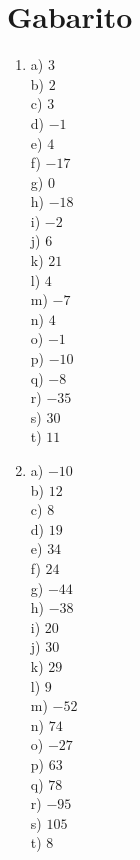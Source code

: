 \documentclass{exam}
\begin{document}
\newpage
\section{Gabarito}

\begin{multicols*}{4}
\setlength{\columnseprule}{1pt}
\begin{enumerate}

\item 	a) $3$ \\
		b) $2$ \\
		c) $3$ \\
		d) $-1$ \\
		e) $4$ \\
		f) $-17$ \\
		g) $0$ \\
		h) $-18$ \\
		i) $-2$ \\
		j) $6$ \\
		k) $21$ \\
		l) $4$ \\
		m) $-7$ \\
		n) $4$ \\
		o) $-1$ \\
		p) $-10$ \\
		q) $-8$ \\
		r) $-35$ \\
		s) $30$ \\
		t) $11$ \\
		
\item 	a) $-10$ \\
		b) $12$ \\
		c) $8$ \\
		d) $19$ \\
		e) $34$ \\
		f) $24$ \\
		g) $-44$ \\
		h) $-38$ \\
		i) $20$ \\
		j) $30$ \\
		k) $29$ \\
		l) $9$ \\
		m) $-52$ \\
		n) $74$ \\
		o) $-27$ \\
		p) $63$ \\
		q) $78$ \\
		r) $-95$ \\
		s) $105$ \\
		t) $8$ \\


\end{enumerate}
\end{multicols*}
\end{document}
